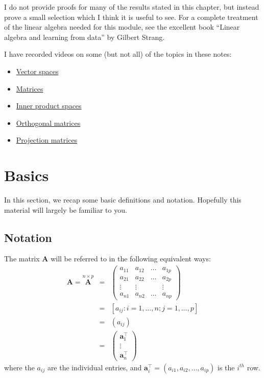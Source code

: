 \documentclass[]{book}
\providecommand{\tightlist}{%
  \setlength{\itemsep}{0pt}\setlength{\parskip}{0pt}}
\theoremstyle{definition}
\theoremstyle{definition}
\theoremstyle{definition}
\theoremstyle{remark}
\begin{document}
I do not provide proofs for many of the results stated in this chapter, but instead prove a small selection which I think it is useful to see. For a complete treatment of the linear algebra needed for this module, see the excellent book ``Linear algebra and learning from data'' by Gilbert Strang.

I have recorded videos on some (but not all) of the topics in these notes:

\begin{itemize}
\tightlist
\item
  \href{https://mediaspace.nottingham.ac.uk/media/Vector+Spaces/1_48xqrp04}{Vector spaces}
\item
  \href{https://mediaspace.nottingham.ac.uk/media/Matrices/1_nqo2u7zs}{Matrices}
\item
  \href{https://mediaspace.nottingham.ac.uk/media/Inner+Product+Spaces/1_nhcbybg3}{Inner product spaces}
\item
  \href{https://mediaspace.nottingham.ac.uk/media/Orthogonal+Matrices/1_rr2ervcs}{Orthogonal matrices}
\item
  \href{https://mediaspace.nottingham.ac.uk/media/Projection/1_soh726fg}{Projection matrices}
\end{itemize}

\hypertarget{linalg-basics}{%
\section{Basics}\label{linalg-basics}}

In this section, we recap some basic definitions and notation. Hopefully this material will largely be familiar to you.

\hypertarget{notation-1}{%
\subsection{Notation}\label{notation-1}}

The matrix \({\mathbf A}\) will be referred to in the following equivalent ways:
\begin{eqnarray*}
{\mathbf A}=\stackrel{n\times p}{\mathbf A} &=& \left(\begin{array}{cccc}
a_{11}&a_{12}&\dots&a_{1p}\\
a_{21}&a_{22}&\dots&a_{2p}\\
\vdots&\vdots&&\vdots\\
a_{n1}&a_{n2}&\dots&a_{np}
\end{array} \right) \\
&=&[a_{ij}: i=1, \ldots , n; j=1, \ldots , p]\\
&=&(a_{ij})\\
&=& \left( \begin{array}{c}\mathbf a_1^\top\\
\vdots\\
\mathbf a_n^\top\end{array}\right)
\end{eqnarray*}
where the \(a_{ij}\) are the individual entries, and \(\mathbf a_i^\top=(a_{i1}, a_{i2}, \ldots, a_{ip})\) is the \(i^{th}\) row.
\end{document}
